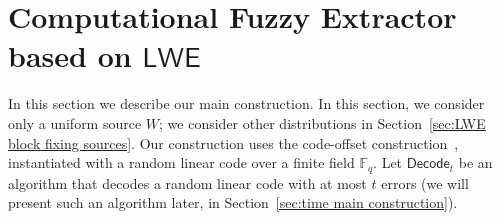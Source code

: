 \documentclass[11pt]{article}
\newcommand{\secref}[1]{\mbox{Section~\ref{#1}}}
\newcommand{\defref}[1]{\mbox{Definition~\ref{#1}}}
\newcommand{\class}[1]{{\ensuremath{\mathsf{#1}}}}
\newcommand{\sketch}{\ensuremath{\class{SS}}\xspace}
\newcommand{\rec}{\ensuremath{\class{Rec}}\xspace}
\newcommand{\Fq}{\ensuremath{\mathbb{F}_q}}
\newcommand{\decode}{\ensuremath{\mathsf{Decode}}}
\newcommand{\hill}{\ensuremath{\mathtt{HILL}}\xspace}
\newcommand{\LWE}{\class{LWE}}
\begin{document}
%

\section{Computational Fuzzy Extractor based on \class{LWE}}
\label{sec:fuzzyCompExt}

In this section we describe our main construction.  In this section, we consider only a uniform source $W$; we consider other distributions in \secref{sec:LWE block fixing sources}.  Our construction uses the code-offset construction~\cite{JW99}, \cite[Section 5]{DBLP:journals/siamcomp/DodisORS08} instantiated with a random linear code over a finite field $\Fq$.   Let $\decode_t$ be an algorithm that decodes a random linear code with at most $t$ errors (we will present such an algorithm later, in \secref{sec:time main construction}). 
\end{document}
